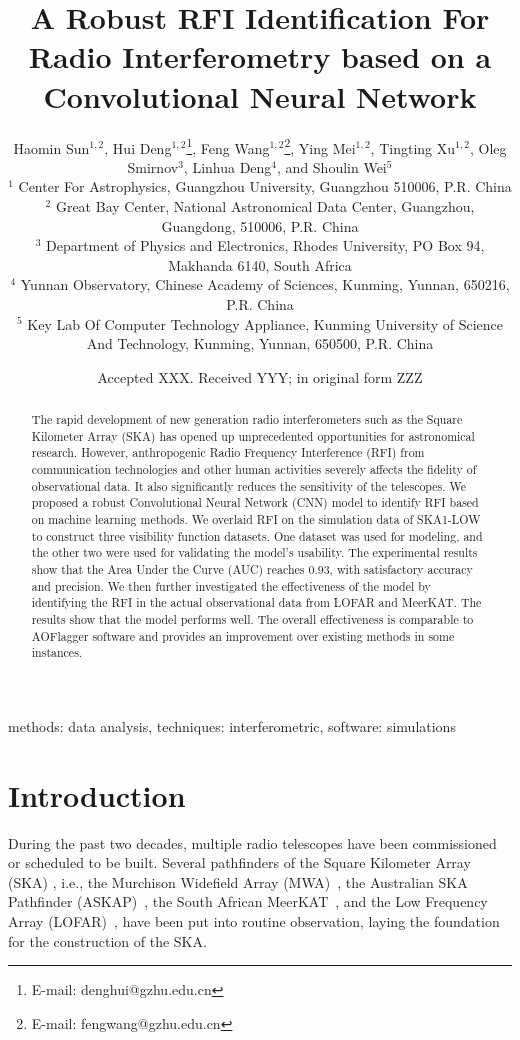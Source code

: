 \documentclass[usenatbib]{mnras}
\title[RFI Identification Based On Deep-Learning]{A Robust RFI Identification For Radio Interferometry based on a Convolutional Neural Network}
\author[Haomin Sun et al.]{
 Haomin Sun$^{1,2}$,
 Hui Deng$^{1,2}$\thanks{E-mail: denghui@gzhu.edu.cn},
 Feng Wang$^{1,2}$\thanks{E-mail: fengwang@gzhu.edu.cn},
 Ying Mei$^{1,2}$,
 Tingting Xu$^{1,2}$, 
 \newauthor
 Oleg Smirnov$^{3}$,
 Linhua Deng$^{4}$, 
 and Shoulin Wei$^{5}$
\\
$^{1}$ Center For Astrophysics, Guangzhou University, Guangzhou 510006, P.R. China\\
$^{2}$ Great Bay Center, National Astronomical Data Center, Guangzhou, Guangdong, 510006, P.R. China\\
$^{3}$ Department of Physics and Electronics, Rhodes University, PO Box 94, Makhanda 6140, South Africa\\
$^{4}$ Yunnan Observatory, Chinese Academy of Sciences, Kunming, Yunnan, 650216, P.R. China\\
$^{5}$ Key Lab Of Computer Technology Appliance, Kunming University of Science And Technology, Kunming, Yunnan, 650500, P.R. China\\
}
\date{Accepted XXX. Received YYY; in original form ZZZ}
\begin{document}
\label{firstpage}
\pagerange{\pageref{firstpage}--\pageref{lastpage}}
\maketitle

\begin{abstract}
The rapid development of new generation radio interferometers such as the Square Kilometer Array (SKA) has opened up unprecedented opportunities for astronomical research. However, anthropogenic Radio Frequency Interference (RFI) from communication technologies and other human activities severely affects the fidelity of observational data. It also significantly reduces the sensitivity of the telescopes. We proposed a robust Convolutional Neural Network (CNN) model to identify RFI based on machine learning methods. We overlaid RFI on the simulation data of SKA1-LOW to construct three visibility function datasets. One dataset was used for modeling, and the other two were used for validating the model's usability. The experimental results show that the Area Under the Curve (AUC) reaches 0.93, with satisfactory accuracy and precision. We then further investigated the effectiveness of the model by identifying the RFI in the actual observational data from LOFAR and MeerKAT. The results show that the model performs well. The overall effectiveness is comparable to AOFlagger software and provides an improvement over existing methods in some instances.

\end{abstract}

\begin{keywords}
methods: data analysis, techniques: interferometric, software: simulations
\end{keywords}


\section{Introduction}
\label{1}

During the past two decades, multiple radio telescopes have been commissioned or scheduled to be built.
Several pathfinders of the Square Kilometer Array (SKA) \citep{Braun+1996}, i.e., the Murchison Widefield Array (MWA)~\citep{lonsdale2009murchison}, the Australian SKA Pathfinder (ASKAP)~\citep{macquart2010commensal}, the South African MeerKAT~\citep{booth2012overview}, and the Low Frequency Array (LOFAR)~\citep{de2009lofar}, have been put into routine observation, laying the foundation for the construction of the SKA.
\end{document}
